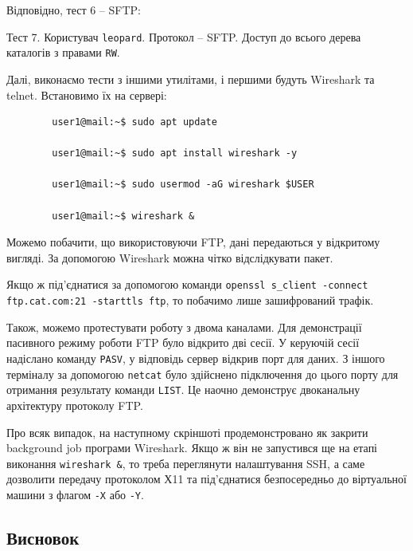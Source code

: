 \documentclass[14pt, a4paper]{extreport}
\begin{document}
	Відповідно, тест 6 -- SFTP:
	
	
	Тест 7. Користувач \texttt{leopard}. Протокол -- SFTP. Доступ до всього дерева каталогів з правами \texttt{RW}.
	
	
	Далі, виконаємо тести з іншими утилітами, і першими будуть Wireshark та telnet. Встановимо їх на сервері: \sideat{[VM 1]} 
	
	\begin{verbatim}
		user1@mail:~$ sudo apt update
		
		user1@mail:~$ sudo apt install wireshark -y
		
		user1@mail:~$ sudo usermod -aG wireshark $USER
		
		user1@mail:~$ wireshark &
	\end{verbatim}
		
	Можемо побачити, що використовуючи FTP, дані передаються у відкритому вигляді. За допомогою Wireshark можна чітко відслідкувати пакет.
	
	
	Якщо ж під'єднатися за допомогою команди \texttt{openssl s\_client -connect ftp.cat.com:21 -starttls ftp}, то побачимо лише зашифрований трафік. \sideat{[VM 2]}
	
	
	Також, можемо протестувати роботу з двома каналами. Для демонстрації пасивного режиму роботи FTP було відкрито дві сесії. У керуючій сесії надіслано команду \texttt{PASV}, у відповідь сервер відкрив порт для даних. З іншого терміналу за допомогою \texttt{netcat} було здійснено підключення до цього порту для отримання результату команди \texttt{LIST}. Це наочно демонструє двоканальну архітектуру протоколу FTP. \sideat{[VM 2]}
	
	
	Про всяк випадок, на наступному скріншоті продемонстровано як закрити background job програми Wireshark. Якщо ж він не запустився ще на етапі виконання \texttt{wireshark \&}, то треба переглянути налаштування SSH, а саме дозволити передачу протоколом Х11 та під'єднатися безпосередньо до віртуальної машини з флагом \texttt{-Х} або \texttt{-Y}. \sideat{[VM 1]}
	
	
	\subsection*{Висновок}
	
\end{document}
